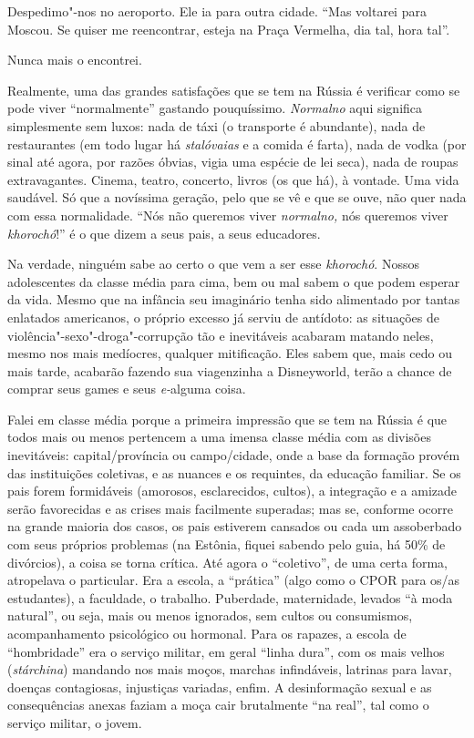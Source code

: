 Despedimo"-nos no aeroporto. Ele ia para outra cidade. ``Mas voltarei
para Moscou. Se quiser me reencontrar, esteja na Praça Vermelha, dia
tal, hora tal''.

Nunca mais o encontrei.

Realmente, uma das grandes satisfações que se tem na Rússia é verificar
como se pode viver ``normalmente'' gastando pouquíssimo. \emph{Normalno}
aqui significa simplesmente sem luxos: nada de táxi (o transporte é
abundante), nada de restaurantes (em todo lugar há \emph{stalóvaias} e a
comida é farta), nada de vodka (por sinal até agora, por razões óbvias,
vigia uma espécie de lei seca), nada de roupas extravagantes. Cinema,
teatro, concerto, livros (os que há), à vontade. Uma vida saudável. Só
que a novíssima geração, pelo que se vê e que se ouve, não quer nada com
essa normalidade. ``Nós não queremos viver \emph{normalno,} nós queremos
viver \emph{khorochó}!'' é o que dizem a seus pais, a seus educadores.

Na verdade, ninguém sabe ao certo o que vem a ser esse \emph{khorochó}.
Nossos adolescentes da classe média para cima, bem ou mal sabem o que
podem esperar da vida. Mesmo que na infância seu imaginário tenha sido
alimentado por tantas enlatados americanos, o próprio excesso já serviu
de antídoto: as situações de violência"-sexo"-droga"-corrupção tão e
inevitáveis acabaram matando neles, mesmo nos mais medíocres, qualquer
mitificação. Eles sabem que, mais cedo ou mais tarde, acabarão fazendo
sua viagenzinha a Disneyworld, terão a chance de comprar seus games e
seus \emph{e-}alguma coisa.

Falei em classe média porque a primeira impressão que se tem na Rússia é
que todos mais ou menos pertencem a uma imensa classe média com as
divisões inevitáveis: capital/província ou campo/cidade, onde a base da
formação provém das instituições coletivas, e as nuances e os requintes,
da educação familiar. Se os pais forem formidáveis (amorosos,
esclarecidos, cultos), a integração e a amizade serão favorecidas e as
crises mais facilmente superadas; mas se, conforme ocorre na grande
maioria dos casos, os pais estiverem cansados ou cada um assoberbado com
seus próprios problemas (na Estônia, fiquei sabendo pelo guia, há 50\%
de divórcios), a coisa se torna crítica. Até agora o ``coletivo'', de
uma certa forma, atropelava o particular. Era a escola, a ``prática''
(algo como o CPOR para os/as estudantes), a faculdade, o trabalho.
Puberdade, maternidade, levados ``à moda natural'', ou seja, mais ou
menos ignorados, sem cultos ou consumismos, acompanhamento psicológico
ou hormonal. Para os rapazes, a escola de ``hombridade'' era o serviço
militar, em geral ``linha dura'', com os mais velhos (\emph{stárchina})
mandando nos mais moços, marchas infindáveis, latrinas para lavar,
doenças contagiosas, injustiças variadas, enfim. A desinformação sexual
e as consequências anexas faziam a moça cair brutalmente ``na real'',
tal como o serviço militar, o jovem.

